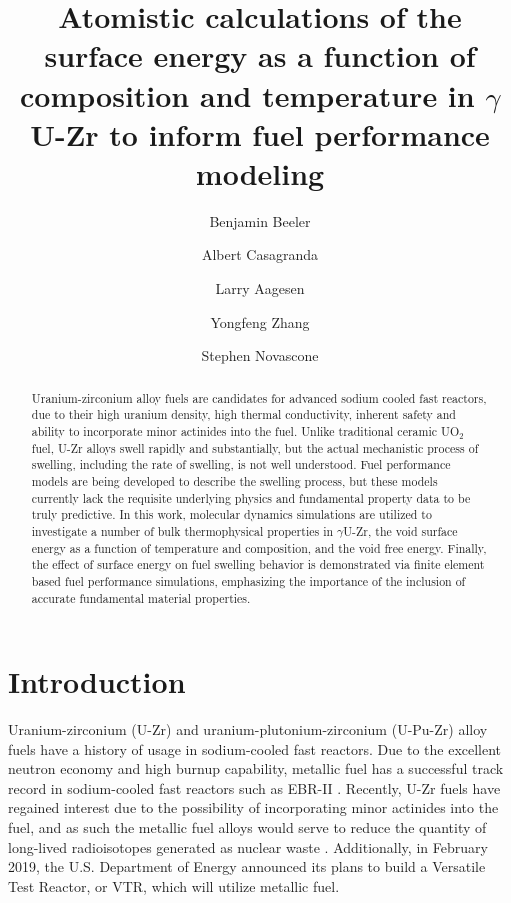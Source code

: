 \documentclass[review]{elsarticle}
\begin{document}
\begin{frontmatter}
\title{Atomistic calculations of the surface energy as a function of composition and temperature in $\gamma$ U-Zr to inform fuel performance modeling}


\author[inl,ncsu]{Benjamin Beeler}
\author[inl]{Albert Casagranda}
\author[inl]{Larry Aagesen}
\author[inl,wisc]{Yongfeng Zhang}
\author[inl]{Stephen Novascone}
\address[inl]{Idaho National Laboratory, Idaho Falls, ID 83415}
\address[ncsu]{North Carolina State University, Raleigh, NC 27607}
\address[wisc]{University of Wisconsin-Madison, Madison, WI 53706}



\begin{abstract}

Uranium-zirconium alloy fuels are candidates for advanced sodium cooled fast reactors, due to their high uranium density, high thermal conductivity, inherent safety and ability to incorporate minor actinides into the fuel. Unlike traditional ceramic UO$_2$ fuel, U-Zr alloys swell rapidly and substantially, but the actual mechanistic process of swelling, including the rate of swelling, is not well understood. Fuel performance models are being developed to describe the swelling process, but these models currently lack the requisite underlying physics and fundamental property data to be truly predictive. In this work, molecular dynamics simulations are utilized to investigate a number of bulk thermophysical properties in  $\gamma$U-Zr, the void surface energy as a function of temperature and composition, and the void free energy. Finally, the effect of surface energy on fuel swelling behavior is demonstrated via finite element based fuel performance simulations, emphasizing the importance of the inclusion of accurate fundamental material properties. 


\end{abstract}
\end{frontmatter}

\linenumbers
\modulolinenumbers[5]

\section{Introduction}

Uranium-zirconium (U-Zr) and uranium-plutonium-zirconium (U-Pu-Zr) alloy fuels have a history of usage in sodium-cooled fast reactors. Due to the excellent neutron economy and high burnup capability, metallic fuel has a successful track record in sodium-cooled fast reactors such as EBR-II \cite{hofman1997}. Recently, U-Zr fuels have regained interest due to the possibility of incorporating minor actinides into the fuel, and as such the metallic fuel alloys would serve to reduce the quantity of long-lived radioisotopes generated as nuclear waste \cite{capriotti2017}. Additionally, in February 2019, the U.S. Department of Energy announced its plans to build a Versatile Test Reactor, or VTR, which will utilize metallic fuel. 
\end{document}
